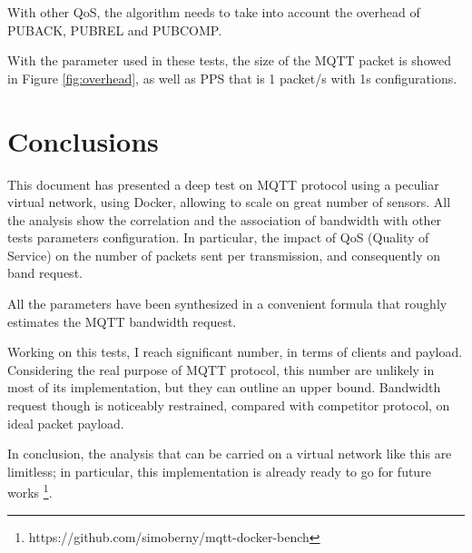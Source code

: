 \documentclass[journal]{IEEEtran}
\begin{document}
With other QoS, the algorithm needs to take into account the overhead of PUBACK, PUBREL and PUBCOMP. 

With the parameter used in these tests, the size of the MQTT packet is showed in Figure \ref{fig:overhead}, as well as PPS that is 1 packet/s with 1s configurations.  

\section{Conclusions}
This document has presented a deep test on MQTT protocol using a peculiar virtual network, using Docker, allowing to scale on great number of sensors. All the analysis show the correlation and the association of bandwidth with other tests parameters configuration. In particular, the impact of QoS (Quality of Service) on the number of packets sent per transmission, and consequently on band request.

All the parameters have been synthesized in a convenient formula that roughly estimates the MQTT bandwidth request. 

Working on this tests, I reach significant number, in terms of clients and payload. Considering the real purpose of MQTT protocol, this number are unlikely in most of its implementation, but they can outline an upper bound. Bandwidth request though is noticeably restrained, compared with competitor protocol, on ideal packet payload. 

In conclusion, the analysis that can be carried on a virtual network like this are limitless; in particular, this implementation is already ready to go for future works \footnote{https://github.com/simoberny/mqtt-docker-bench}.



\end{document}
